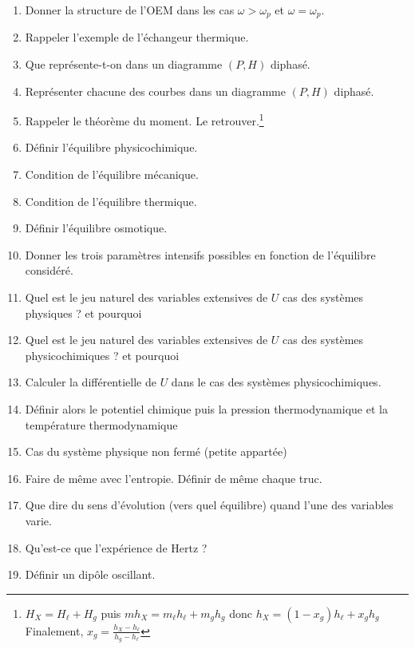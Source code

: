 \documentclass[a4paper, 11pt, hidelinks]{article}
\begin{document}
\begin{enumerate}
    \item Donner la structure de l'OEM dans les cas $\omega > \omega_p$ et $\omega=\omega_p$. \cite{Chapitre16}
    \item Rappeler l'exemple de l'échangeur thermique. \cite{Chapitre19}
    \item Que représente-t-on dans un diagramme $(P,H)$ diphasé. \cite{Chapitre19}
    \item Représenter chacune des courbes dans un diagramme $(P,H)$ diphasé. \cite{Chapitre19}
    \item Rappeler le théorème du moment. Le retrouver.\footnote{$H_X=H_\ell + H_g$ puis $mh_X=m_\ell h_\ell + m_g h_g$ donc $h_X=(1-x_g)h_\ell + x_g h_g$ Finalement, $x_g = \frac{h_X-h_\ell}{h_g-h_\ell}$} \cite{Chapitre19}
    \item Définir l'équilibre physicochimique. \cite{Chapitre1bis}
    \item Condition de l'équilibre mécanique. \cite{Chapitre1bis}
    \item Condition de l'équilibre thermique. \cite{Chapitre1bis}
    \item Définir l'équilibre osmotique. \cite{Chapitre1bis}
    \item Donner les trois paramètres intensifs possibles en fonction de l'équilibre considéré. \cite{Chapitre1bis}
    \item Quel est le jeu naturel des variables extensives de $U$ cas des systèmes physiques ? et pourquoi \cite{Chapitre1bis}
    \item Quel est le jeu naturel des variables extensives de $U$ cas des systèmes physicochimiques ? et pourquoi \cite{Chapitre1bis}
    \item Calculer la différentielle de $U$ dans le cas des systèmes physicochimiques. \cite{Chapitre1bis}
    \item Définir alors le potentiel chimique puis la pression thermodynamique et la température thermodynamique \cite{Chapitre1bis}
    \item Cas du système physique non fermé (petite appartée) \cite{Chapitre1bis}
    \item Faire de même avec l'entropie. Définir de même chaque truc. \cite{Chapitre1bis}
    \item Que dire du sens d'évolution (vers quel équilibre) quand l'une des variables varie. \cite{Chapitre1bis}
    \item Qu'est-ce que l'expérience de Hertz ? \cite{Chapitre18}
    \item Définir un dipôle oscillant. \cite{Chapitre18}

\end{enumerate}
\end{document}
